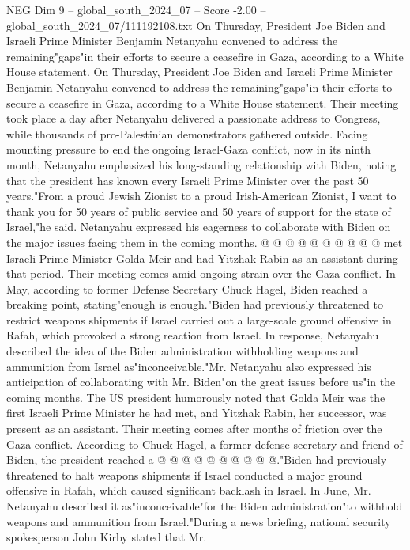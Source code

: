 \begin{textsample}{NEG Dim 9 – global\_south\_2024\_07 – Score -2.00 – global\_south\_2024\_07/111192108.txt}  \label{ex:f9_neg_349}
On Thursday, President Joe Biden and Israeli Prime Minister Benjamin Netanyahu convened to address the remaining"gaps"in their efforts to secure a ceasefire in Gaza, according to a White House statement.
On Thursday, President Joe Biden and Israeli Prime Minister Benjamin Netanyahu convened to address the remaining"gaps"in their efforts to secure a ceasefire in Gaza, according to a White House statement.
Their meeting took place a day after Netanyahu delivered a passionate address to Congress, while thousands of pro-Palestinian demonstrators gathered outside.
Facing mounting pressure to end the ongoing Israel-Gaza conflict, now in its ninth month, Netanyahu emphasized his long-standing relationship with Biden, noting that the president has known every Israeli Prime Minister over the past 50 years."From a proud Jewish Zionist to a proud Irish-American Zionist, I want to thank you for 50 years of public service and 50 years of support for the state of Israel,"he said.
Netanyahu expressed his eagerness to collaborate with Biden on the major issues facing them in the coming months. @ @ @ @ @ @ @ @ @ @ met Israeli Prime Minister Golda Meir and had Yitzhak Rabin as an assistant during that period.
Their meeting comes amid ongoing strain over the Gaza conflict.
In May, according to former Defense Secretary Chuck Hagel, Biden reached a breaking point, stating"enough is enough."Biden had previously threatened to restrict weapons shipments if Israel carried out a large-scale ground offensive in Rafah, which provoked a strong reaction from Israel.
In response, Netanyahu described the idea of the Biden administration withholding weapons and ammunition from Israel as"inconceivable."Mr.
Netanyahu also expressed his anticipation of collaborating with Mr.
Biden"on the great issues before us"in the coming months.
The US president humorously noted that Golda Meir was the first Israeli Prime Minister he had met, and Yitzhak Rabin, her successor, was present as an assistant.
Their meeting comes after months of friction over the Gaza conflict.
According to Chuck Hagel, a former defense secretary and friend of Biden, the president reached a @ @ @ @ @ @ @ @ @ @."Biden had previously threatened to halt weapons shipments if Israel conducted a major ground offensive in Rafah, which caused significant backlash in Israel.
In June, Mr.
Netanyahu described it as"inconceivable"for the Biden administration"to withhold weapons and ammunition from Israel."During a news briefing, national security spokesperson John Kirby stated that Mr.

\end{textsample}
